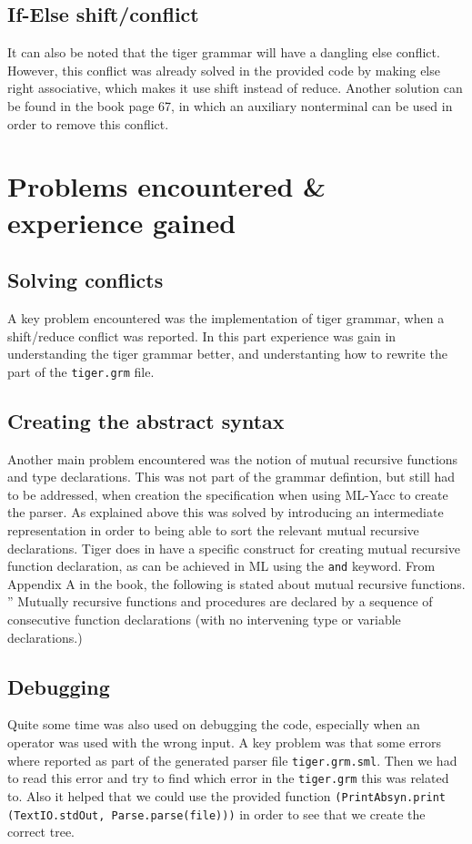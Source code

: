 \documentclass{article}
\begin{document}
\subsection{If-Else shift/conflict}
It can also be noted that the tiger grammar will have a dangling else conflict. However, this conflict was already solved in the provided code by making else right associative, which makes it use shift instead of reduce. Another solution can be found in the book page 67, in which an auxiliary nonterminal can be used in order to remove this conflict.

\section{Problems encountered \& experience gained}
\subsection{Solving conflicts}
A key problem encountered was the implementation of tiger grammar, when a shift/reduce conflict was reported. In this part experience was gain in understanding the tiger grammar better, and understanting how to rewrite the part of the \texttt{tiger.grm} file. 

\subsection{Creating the abstract syntax}
Another main problem encountered was the notion of mutual recursive functions and type declarations. This was not part of the grammar defintion, but still had to be addressed, when creation the specification when using ML-Yacc to create the parser. As explained above this was solved by introducing an intermediate representation in order to being able to sort the relevant mutual recursive declarations. Tiger does in have a specific construct for creating mutual recursive function declaration, as can be achieved in ML using the \texttt{and} keyword. From Appendix A in the book, the following is stated about mutual recursive functions. '' Mutually recursive functions and procedures are declared by a sequence of consecutive function declarations (with no intervening type or variable declarations.)

\subsection{Debugging}
Quite some time was also used on debugging the code, especially when an operator was used with the wrong input. A key problem was that some errors where reported as part of the generated parser file \texttt{tiger.grm.sml}. Then we had to read this error and try to find which error in the \texttt{tiger.grm} this was related to. Also it helped that we could use the provided function \texttt{(PrintAbsyn.print (TextIO.stdOut, Parse.parse(file)))} in order to see that we create the correct tree.
\end{document}
